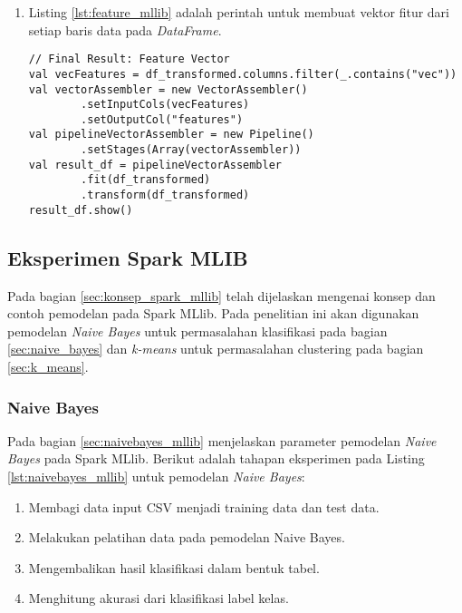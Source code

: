 \begin{enumerate}
\newpage
\item Listing \ref{lst:feature_mllib} adalah perintah untuk membuat vektor fitur dari setiap baris data pada \textit{DataFrame}.
\begin{lstlisting}[basicstyle=\ttfamily, frame=single,
	columns=fullflexible, keepspaces=true, breaklines=true, label=lst:feature_mllib, caption=Membuat Vektor Fitur]
// Final Result: Feature Vector
val vecFeatures = df_transformed.columns.filter(_.contains("vec"))
val vectorAssembler = new VectorAssembler()
		.setInputCols(vecFeatures)
		.setOutputCol("features")
val pipelineVectorAssembler = new Pipeline()
		.setStages(Array(vectorAssembler))
val result_df = pipelineVectorAssembler
		.fit(df_transformed)
		.transform(df_transformed)
result_df.show()
\end{lstlisting}

\end{enumerate}


\subsection{Eksperimen Spark MLIB}
Pada bagian \ref{sec:konsep_spark_mllib} telah dijelaskan mengenai konsep dan contoh pemodelan pada Spark MLlib. Pada penelitian ini akan digunakan pemodelan \textit{Naive Bayes} untuk permasalahan klasifikasi pada bagian \ref{sec:naive_bayes} dan \textit{k-means} untuk permasalahan clustering pada bagian \ref{sec:k_means}.

\subsubsection{Naive Bayes}
\noindent Pada bagian \ref{sec:naivebayes_mllib} menjelaskan parameter pemodelan \textit{Naive Bayes} pada Spark MLlib. Berikut adalah tahapan eksperimen pada Listing \ref{lst:naivebayes_mllib} untuk pemodelan \textit{Naive Bayes}:
\begin{enumerate}
\item Membagi data input CSV menjadi training data dan test data.
\item Melakukan pelatihan data pada pemodelan Naive Bayes.
\item Mengembalikan hasil klasifikasi dalam bentuk tabel.
\item Menghitung akurasi dari klasifikasi label kelas.
\end{enumerate}	

